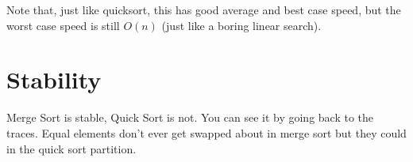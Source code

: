 \documentclass[twoside=false,DIV=14]{scrartcl}
\begin{document}
Note that, just like quicksort, this has good average and best case speed, but the worst case speed is still $O(n)$ (just like a boring linear search).

\section{Stability}
Merge Sort is stable, Quick Sort is not.  You can see it by going back to the traces.  Equal elements don't ever get swapped about in merge sort but they could in the quick sort partition.
\end{document}
